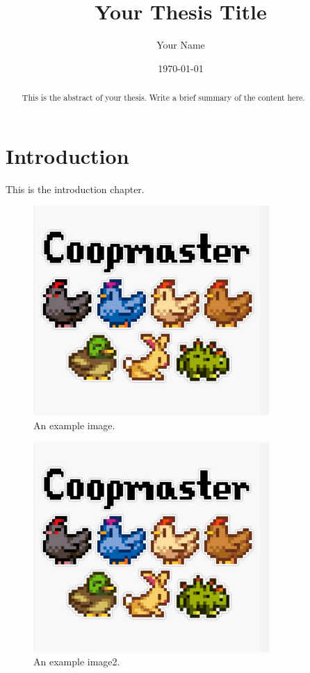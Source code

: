 \documentclass[12pt, a4paper]{report}
\begin{document}
\title{Your Thesis Title}
\author{Your Name}
\date{\today}
\maketitle

\begin{abstract}
  This is the abstract of your thesis. Write a brief summary of the content here.
\end{abstract}

\tableofcontents

\printindex

\chapter{Introduction}
\label{chap:introduction}
This is the introduction chapter.

\begin{figure}[h!]
  \centering
  \includegraphics[width=0.8\textwidth]{./images/coopmaster.png}
  \caption{An example image.}
  \label{fig:example}
\end{figure}


\begin{figure}[h!]
  \centering
  \includegraphics[width=0.8\textwidth]{coopmaster.png}
  \caption{An example image2.}
  \label{fig:example2}
\end{figure}
\end{document}
